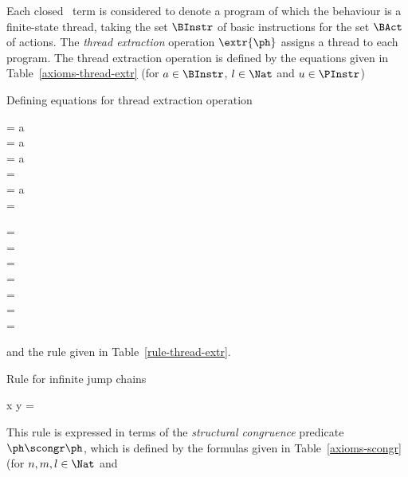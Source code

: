 \documentclass[fleqn]{llncs}
\begin{document}
Each closed \PGA\ term is considered to denote a program of which the
behaviour is a finite-state thread, taking the set $\BInstr$ of basic
instructions for the set $\BAct$ of actions.
The \emph{thread extraction} operation $\extr{\ph}$ assigns a thread to
each program.
The thread extraction operation is defined by the equations given in
Table~\ref{axioms-thread-extr} (for $a \in \BInstr$, $l \in \Nat$ and
$u \in \PInstr$)\begin{table}[!t]
\caption{Defining equations for thread extraction operation}
\label{axioms-thread-extr}
\begin{eqntbl}
\begin{eqncol}
 = a \bapf \DeadEnd \\
 = a \bapf {} \\
 = a \bapf \DeadEnd \\
 =
 \\
 = a \bapf \DeadEnd \\
 =
\end{eqncol}
\qquad
\begin{eqncol}
 = \DeadEnd \\
 = \DeadEnd \\
 =  \\
 = \DeadEnd \\
 =  \\
\extr{\halt} = \Stop \\
 = \Stop
\end{eqncol}
\end{eqntbl}
\end{table}
and the rule given in Table~\ref{rule-thread-extr}.\begin{table}[!t]
\caption{Rule for infinite jump chains}
\label{rule-thread-extr}
\begin{eqntbl}
\begin{eqncol}
x \scongr {} \conc y \Implies {} = \DeadEnd
\end{eqncol}
\end{eqntbl}
\end{table}
This rule is expressed in terms of the \emph{structural congruence}
predicate $\ph \scongr \ph$, which is defined by the formulas given in
Table~\ref{axioms-scongr} (for $n,m,l \in \Nat$ and
\end{document}
